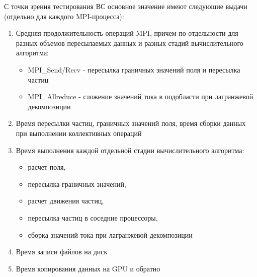 С точки зрения тестирования ВС основное значение имеют следующие выдачи (отдельно для каждого MPI-процесса):

\begin{enumerate}
	\item Средняя продолжительность операций MPI, причем по отдельности для разных объемов пересылаемых данных и разных стадий вычислительного алгоритма:
	\begin{itemize}
		\item MPI\_Send/Recv - пересылка граничных значений поля и пересылка частиц
		\item MPI\_Allreduce - сложение значений тока в подобласти при лагранжевой декомпозиции
		
	\end{itemize}	
	\item Время пересылки частиц, граничных значений поля, время сборки данных при выполнении коллективных операций   
	\item Время выполнения каждой отдельной стадии вычислительного алгоритма:
	\begin{itemize}
		\item расчет поля, 
		\item пересылка граничных значений, 
		\item расчет движения частиц, 
		\item пересылка частиц в соседние процессоры, 
		\item сборка значений тока при лагранжевой декомпозиции
	\end{itemize}
	\item Время записи файлов на диск 
	\item Время копирования данных на GPU и обратно
	
\end{enumerate}



